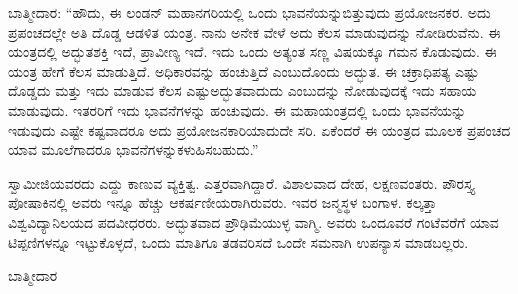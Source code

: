 ಬಾತ್ಮೀದಾರ: “ಹೌದು, ಈ ಲಂಡನ್​ ಮಹಾನಗರಿಯಲ್ಲಿ ಒಂದು ಭಾವನೆಯನ್ನು\break ಬಿತ್ತುವುದು ಪ್ರಯೋಜನಕರ. ಅದು ಪ್ರಪಂಚದಲ್ಲೇ ಅತಿ ದೊಡ್ಡ ಆಡಳಿತ ಯಂತ್ರ. ನಾನು ಅನೇಕ ವೇಳೆ ಅದು ಕೆಲಸ ಮಾಡುವುದನ್ನು ನೋಡಿರುವೆನು. ಈ ಯಂತ್ರದಲ್ಲಿ ಅದ್ಭುತ\break ಶಕ್ತಿ ಇದೆ, ಪ್ರಾವೀಣ್ಯ ಇದೆ. ಇದು ಒಂದು ಅತ್ಯಂತ ಸಣ್ಣ ವಿಷಯಕ್ಕೂ ಗಮನ ಕೊಡುವುದು. ಈ ಯಂತ್ರ ಹೇಗೆ ಕೆಲಸ ಮಾಡುತ್ತಿದೆ. ಅಧಿಕಾರವನ್ನು ಹಂಚುತ್ತಿದೆ ಎಂಬುದೊಂದು ಅದ್ಭುತ. ಈ ಚಕ್ರಾಧಿಪತ್ಯ ಎಷ್ಟು ದೊಡ್ಡದು ಮತ್ತು ಇದು ಮಾಡುವ ಕೆಲಸ ಎಷ್ಟು\break ಅದ್ಭುತವಾದುದು ಎಂಬುದನ್ನು ನೋಡುವುದಕ್ಕೆ ಇದು ಸಹಾಯ ಮಾಡುವುದು. ಇತರರಿಗೆ ಇದು ಭಾವನೆಗಳನ್ನು ಹಂಚುವುದು. ಈ ಮಹಾಯಂತ್ರದಲ್ಲಿ ಒಂದು ಭಾವನೆಯನ್ನು ಇಡುವುದು ಎಷ್ಟೇ ಕಷ್ಟವಾದರೂ ಅದು ಪ್ರಯೋಜನಕಾರಿಯಾದುದೇ ಸರಿ. ಏಕೆಂದರೆ ಈ ಯಂತ್ರದ ಮೂಲಕ ಪ್ರಪಂಚದ ಯಾವ ಮೂಲೆಗಾದರೂ ಭಾವನೆಗಳನ್ನು\break ಕಳುಹಿಸಬಹುದು.”

\eject

ಸ್ವಾಮೀಜಿಯವರದು ಎದ್ದು ಕಾಣುವ ವ್ಯಕ್ತಿತ್ವ. ಎತ್ತರವಾಗಿದ್ದಾರೆ. ವಿಶಾಲವಾದ ದೇಹ, ಲಕ್ಷಣವಂತರು. ಪೌರಸ್ತ್ಯ ಪೋಷಾಕಿನಲ್ಲಿ ಅವರು ಇನ್ನೂ ಹೆಚ್ಚು ಆಕರ್ಷಣೀಯರಾಗಿರುವರು. ಇವರ ಜನ್ಮಸ್ಥಳ ಬಂಗಾಳ. ಕಲ್ಕತ್ತಾ ವಿಶ್ವವಿದ್ಯಾನಿಲಯದ ಪದವೀಧರರು. ಅದ್ಭುತವಾದ ಪ್ರೌಢಿಮೆಯುಳ್ಳ ವಾಗ್ಮಿ. ಅವರು ಒಂದೂವರೆ ಗಂಟೆವರೆಗೆ ಯಾವ ಟಿಪ್ಪಣಿಗಳನ್ನೂ ಇಟ್ಟುಕೊಳ್ಳದೆ, ಒಂದು ಮಾತಿಗೂ ತಡವರಿಸದೆ ಒಂದೇ ಸಮನಾಗಿ ಉಪನ್ಯಾಸ ಮಾಡಬಲ್ಲರು.

\begin{flushright}
ಬಾತ್ಮೀದಾರ
\end{flushright}

